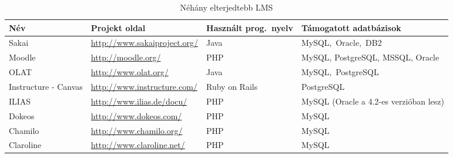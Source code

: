 
\begin{table}[h]
	\caption{Néhány elterjedtebb LMS}
	\centering
	\begin{tabular}{| p{3cm} | p{4cm} | p{2cm} | p{4cm} |}
		\hline
		\rowcolor{MyTableColor} \textbf{Név} & \textbf{Projekt oldal} & \textbf{Használt prog.~nyelv} & Támogatott adatbázisok \\
		\hline
		Sakai & \href{http://www.sakaiproject.org/}{http://www.sakaiproject.org/} & Java & MySQL,~Oracle,~DB2 \\
		\hline
		Moodle & \href{http://moodle.org/}{http://moodle.org/} & PHP & MySQL, PostgreSQL, MSSQL, Oracle \\
		\hline
		OLAT &  \href{http://www.olat.org/}{http://www.olat.org/} & Java & MySQL,~PostgreSQL \\
		\hline
		Instructure - Canvas & \href{http://www.instructure.com/}{http://www.instructure.com/} & Ruby on Rails & PostgreSQL \\
		\hline
		ILIAS & \href{http://www.ilias.de/docu/}{http://www.ilias.de/docu/} & PHP & MySQL (Oracle a 4.2-es verzióban lesz) \\
		\hline
		Dokeos & \href{http://www.dokeos.com/}{http://www.dokeos.com/} & PHP & MySQL \\
		\hline
		Chamilo & \href{http://www.chamilo.org/}{http://www.chamilo.org/} & PHP & MySQL \\
		\hline		
		Claroline & \href{http://www.claroline.net/}{http://www.claroline.net/} & PHP & MySQL \\
		\hline
	\end{tabular}
	\label{tab:openlms}
\end{table}